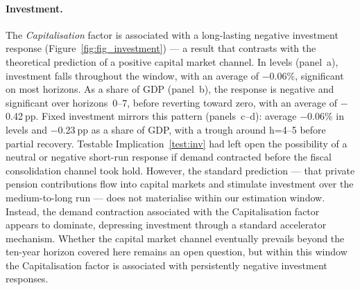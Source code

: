 \documentclass[11pt,english,a4paper, twoside, authoryear]{article}
\begin{document}
\paragraph{Investment.} The \textit{Capitalisation} factor is associated with a long-lasting negative investment response (Figure~\ref{fig:fig_investment}) --- a result that  contrasts with the theoretical prediction of a positive capital market channel. In levels (panel~a), investment falls throughout the window, with an average of $-$0.06\%, significant on most horizons. As a share of GDP (panel~b), the response is negative and significant over horizons~0--7, before reverting toward zero, with an average of $-$0.42$~$pp. Fixed investment mirrors this pattern (panels~c--d): average $-$0.06\% in levels and $-$0.23$~$pp as a share of GDP, with a trough around h=4--5 before partial recovery. Testable Implication~\ref{test:inv} had left open the possibility of a neutral or negative short-run response if demand contracted before the fiscal consolidation channel took hold. However, the standard prediction --- that private pension contributions flow into capital markets and stimulate investment over the medium-to-long run --- does not materialise within our estimation window. Instead, the demand contraction associated with the Capitalisation factor appears to dominate, depressing investment through a standard accelerator mechanism. Whether the capital market channel eventually prevails beyond the ten-year horizon covered here remains an open question, but within this window the Capitalisation factor is associated with persistently negative investment responses.\\
\end{document}
